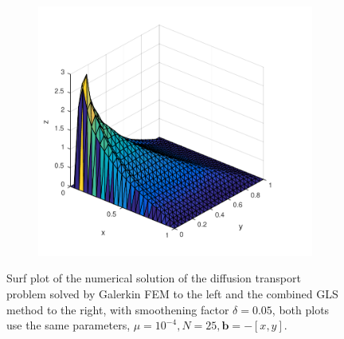 \begin{figure}[h]
\begin{subfigure}[b]{0.48\textwidth}
	\includegraphics[width=\textwidth]{Figures/GLSFEM_difftrans_aNeg.pdf}
  \end{subfigure}
  \vspace{-0.1\baselineskip}
	\caption{Surf plot of the numerical solution of the diffusion transport problem solved by Galerkin FEM to the left and the combined GLS method to the right, with smoothening factor $\delta = 0.05$, both plots use the same parameters, $\mu = 10^{-4},N=25,\mathbf{b} = -[x,y]$.}
  \label{fig:SurfDiffTransPositiveFEM}
\end{figure}

